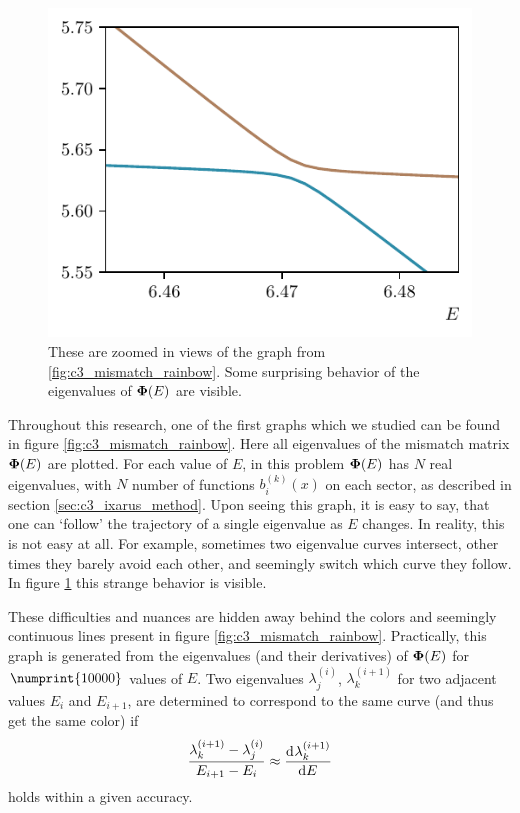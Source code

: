 \begin{figure}
\begin{center}
    \hfill
    \includegraphics[width=.495\textwidth]{img/chapter3/mismatch_rainbow_zoomed_1.pdf}
  \end{center}
  \caption{These are zoomed in views of the graph from \ref{fig:c3_mismatch_rainbow}. Some surprising behavior of the eigenvalues of $\vb{\Phi}(E)$ are visible.}\label{fig:c3_mismatch_rainbow_zoom}
\end{figure}

Throughout this research, one of the first graphs which we studied can be found in figure \ref{fig:c3_mismatch_rainbow}. Here all eigenvalues of the mismatch matrix $\vb{\Phi}(E)$ are plotted. For each value of $E$, in this problem $\vb{\Phi}(E)$ has $N$ real eigenvalues, with $N$ number of functions $b_i^{(k)}(x)$ on each sector, as described in section \ref{sec:c3_ixarus_method}. Upon seeing this graph, it is easy to say, that one can `follow' the trajectory of a single eigenvalue as $E$ changes. In reality, this is not easy at all. For example, sometimes two eigenvalue curves intersect, other times they barely avoid each other, and seemingly switch which curve they follow. In figure \ref{fig:c3_mismatch_rainbow_zoom} this strange behavior is visible.


These difficulties and nuances are hidden away behind the colors and seemingly continuous lines present in figure \ref{fig:c3_mismatch_rainbow}. Practically, this graph is generated from the eigenvalues (and their derivatives) of $\vb{\Phi}(E)$ for $\numprint{10000}$ values of $E$. Two eigenvalues $\lambda^{(i)}_j$, $\lambda^{(i+1)}_k$  for two adjacent values $E_{i}$ and $E_{i+1}$, are determined to correspond to the same curve (and thus get the same color) if
$$ \frac{\lambda^{(i+1)}_k  - \lambda^{(i)}_j}{E_{i+1} - E_i} \approx \dv[]{\lambda^{(i+1)}_k}{E} $$
holds within a given accuracy.

